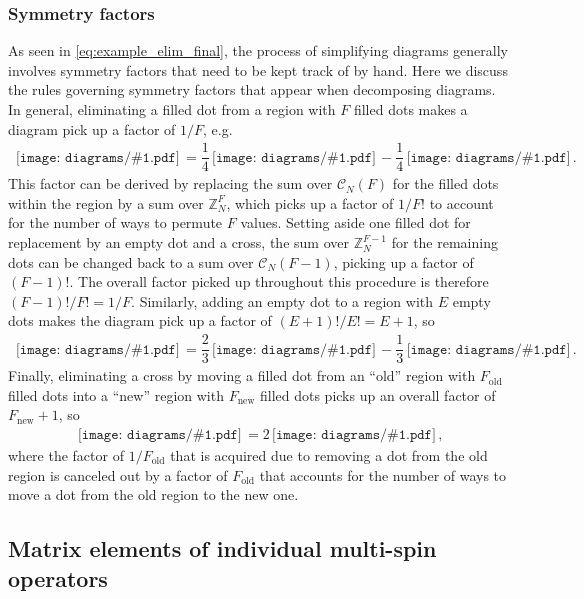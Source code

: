 \documentclass[nofootinbib,notitlepage,11pt]{revtex4-2}
\renewcommand{\t}{\text} %
\newcommand{\f}[2]{\dfrac{#1}{#2}} %
\newcommand{\p}[1]{\left(#1\right)} %
\newcommand{\1}{\mathds{1}}
\newcommand{\C}{\mathcal{C}}
\newcommand{\ZZ}{\mathbb{Z}}
\newcommand{\diagram}[1]
{\,\texttt{[image: diagrams/\#1.pdf]}\,}
\begin{document}
\subsubsection{Symmetry factors}
\label{sec:symmertry_factors}

As seen in \eqref{eq:example_elim_final}, the process of simplifying
diagrams generally involves symmetry factors that need to be kept
track of by hand.  Here we discuss the rules governing symmetry
factors that appear when decomposing diagrams.  In general,
eliminating a filled dot from a region with $F$ filled dots makes a
diagram pick up a factor of $1/F$, e.g.
\begin{align}
  \diagram{example_sym}
  = \f14 \diagram{example_sym_o}
  - \f14 \diagram{example_sym_x}.
\end{align}
This factor can be derived by replacing the sum over $\C_N\p{F}$ for
the filled dots within the region by a sum over $\ZZ_N^{F}$, which
picks up a factor of $1/F!$ to account for the number of ways to
permute $F$ values.  Setting aside one filled dot for replacement by
an empty dot and a cross, the sum over $\ZZ_N^{F-1}$ for the remaining
dots can be changed back to a sum over $\C_N\p{F-1}$, picking up a
factor of $\p{F-1}!$.  The overall factor picked up throughout this
procedure is therefore $\p{F-1}!/F!=1/F$.  Similarly, adding an empty
dot to a region with $E$ empty dots makes the diagram pick up a factor
of $\p{E+1}!/E!=E+1$, so
\begin{align}
  \diagram{example_sym_o}
  = \f23 \diagram{example_sym_oo}
  - \f13 \diagram{example_sym_ox}.
\end{align}
Finally, eliminating a cross by moving a filled dot from an ``old''
region with $F_{\t{old}}$ filled dots into a ``new'' region with
$F_{\t{new}}$ filled dots picks up an overall factor of
$F_{\t{new}}+1$, so
\begin{align}
  \diagram{example_sym_x}
  = 2 \diagram{example_sym_x_elim},
\end{align}
where the factor of $1/F_{\t{old}}$ that is acquired due to removing a
dot from the old region is canceled out by a factor of $F_{\t{old}}$
that accounts for the number of ways to move a dot from the old region
to the new one.

\subsection{Matrix elements of individual multi-spin operators}
\end{document}
